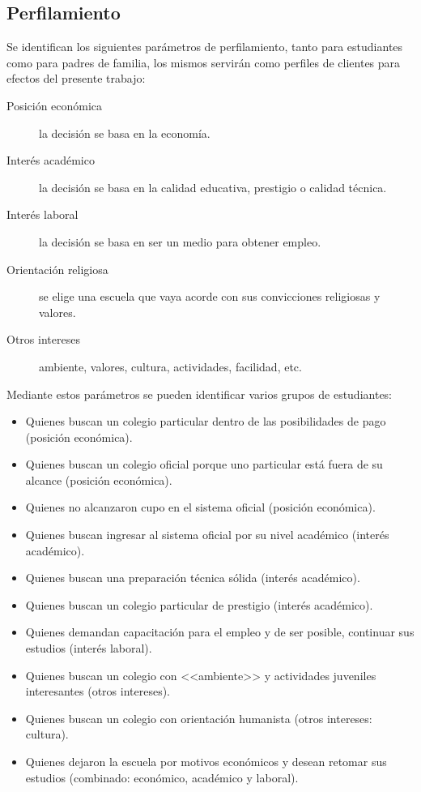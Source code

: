 \subsection{Perfilamiento}

Se identifican los siguientes parámetros de perfilamiento, tanto para estudiantes como para padres de familia, los mismos servirán como perfiles de clientes para efectos del presente trabajo:

\begin{description}
	\item [Posición económica] la decisión se basa en la economía.
	\item [Interés académico] la decisión se basa en la calidad educativa, prestigio o calidad técnica.
	\item [Interés laboral] la decisión se basa en ser un medio para obtener empleo.
	\item [Orientación religiosa] se elige una escuela que vaya acorde con sus convicciones religiosas y valores.
	\item [Otros intereses] ambiente, valores, cultura, actividades, facilidad, etc.
\end{description}

Mediante estos parámetros se pueden identificar varios grupos de estudiantes:

\begin{itemize}
	\item Quienes buscan un colegio particular dentro de las posibilidades de pago (posición económica).
	\item Quienes buscan un colegio oficial porque uno particular está fuera de su alcance (posición económica).
	\item Quienes no alcanzaron cupo en el sistema oficial (posición económica).
	\item Quienes buscan ingresar al sistema oficial por su nivel académico (interés académico).
	\item Quienes buscan una preparación técnica sólida (interés académico).
	\item Quienes buscan un colegio particular de prestigio (interés académico).
	\item Quienes demandan capacitación para el empleo y de ser posible, continuar sus estudios (interés laboral).
	\item Quienes buscan un colegio con <<ambiente>> y actividades juveniles interesantes (otros intereses).
	\item Quienes buscan un colegio con orientación humanista (otros intereses: cultura).
	\item Quienes dejaron la escuela por motivos económicos y desean retomar sus estudios (combinado: económico, académico y laboral).
\end{itemize}


